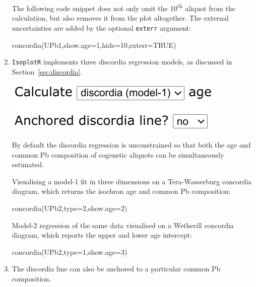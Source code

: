 \begin{refsection}
\begin{enumerate}
The following code snippet does not only omit the
10\textsuperscript{th} aliquot from the calculation, but also removes
it from the plot altogether. The external uncertainties are added by
the optional \texttt{exterr} argument:

\begin{console}
concordia(UPb1,show.age=1,hide=10,exterr=TRUE)
\end{console}

\item \texttt{IsoplotR} implements three discordia regression models,
  as discussed in Section~\ref{sec:discordia}.

  \noindent\begin{minipage}[t]{.3\linewidth}
  \strut\vspace*{-\baselineskip}\newline
  \includegraphics[width=\linewidth]{../figures/discordia.png}
  \end{minipage}
  \begin{minipage}[t]{.7\linewidth}
    By default the discordia regression is unconstrained so that both
    the age and common Pb composition of cogenetic aliquots can be
    simultaneously estimated.\\
  \end{minipage}

  \noindent Visualising a model-1 fit in three dimensions on a
  Tera-Wasserburg concordia diagram, which returns the isochron age
  and common Pb composition:
\begin{console}
concordia(UPb2,type=2,show.age=2)
\end{console}

\noindent Model-2 regression of the same data visualised on a
Wetherill concordia diagram, which reports the upper and lower age
intercept:
\begin{console}
concordia(UPb2,type=1,show.age=3)
\end{console}

\item The discordia line can also be anchored to a particular common
  Pb composition.
  

\end{enumerate}
\end{refsection}
